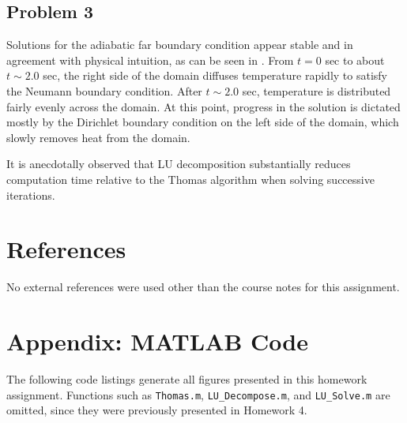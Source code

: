 \documentclass[11pt]{article}
\begin{document}
\subsection{Problem 3}

Solutions for the adiabatic far boundary condition appear stable and in agreement with physical intuition, as can be seen in . From $t=0$ sec to about $t \sim 2.0$ sec, the right side of the domain diffuses temperature rapidly to satisfy the Neumann boundary condition. After $t \sim 2.0$ sec, temperature is distributed fairly evenly across the domain. At this point, progress in the solution is dictated mostly by the Dirichlet boundary condition on the left side of the domain, which slowly removes heat from the domain.

It is anecdotally observed that LU decomposition substantially reduces computation time relative to the Thomas algorithm when solving successive iterations.

\section{References} %

No external references were used other than the course notes for this assignment.

\section*{Appendix: MATLAB Code} %

The following code listings generate all figures presented in this homework assignment. Functions such as \lstinline|Thomas.m|, \lstinline|LU_Decompose.m|, and \lstinline|LU_Solve.m| are omitted, since they were previously presented in Homework 4.


\end{document}
